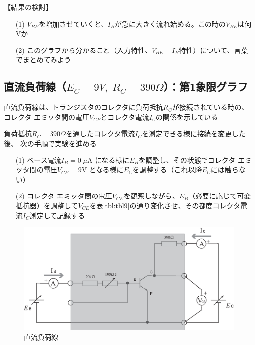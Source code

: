 \documentclass[uplatex,a4paper,11pt,oneside,openany]{jsbook}
\begin{document}
【結果の検討】

\begin{enumerate}
	\item[(1)] $V_{BE}$を増加させていくと、$I_B$が急に大きく流れ始める。この時の$V_{BE}$は何Vか\\
	\item[(2)] このグラフから分かること（入力特性、$V_{BE}-I_B$特性）について、言葉でまとめてみよう
\end{enumerate}

\newpage

\subsection{直流負荷線（$E_C=9V,\;R_C=390\Omega$）：第1象限グラフ}

直流負荷線は、トランジスタのコレクタに負荷抵抗$R_C$が接続されている時の、
コレクタ-エミッタ間の電圧$V_{CE}$とコレクタ電流$I_C$の関係を示している


負荷抵抗$R_C=390\Omega$を通したコレクタ電流$I_C$を測定できる様に接続を変更した後、
次の手順で実験を進める

\begin{enumerate}
	\item[(1)] ベース電流$I_B=0\;\mu$A になる様に$E_B$を調整し、その状態でコレクタ-エミッタ間の電圧$V_{CE}=9$V となる様に$E_C$を調整する（これ以降$E_C$には触らない）
	\item[(2)] コレクタ-エミッタ間の電圧$V_{CE}$を観察しながら、$E_B$（必要に応じて可変抵抗器）を調整して$V_{CE}$を表\ref{tbl:tbl9}の通り変化させ、その都度コレクタ電流$I_C$測定して記録する  
\end{enumerate}



\begin{figure}[H]
	\centering
	\includegraphics[keepaspectratio, scale=0.45, angle=0]
	{figs/eps/ex4.eps}
	\caption{直流負荷線}
	\label{fig:ex3}
\end{figure}
\end{document}

